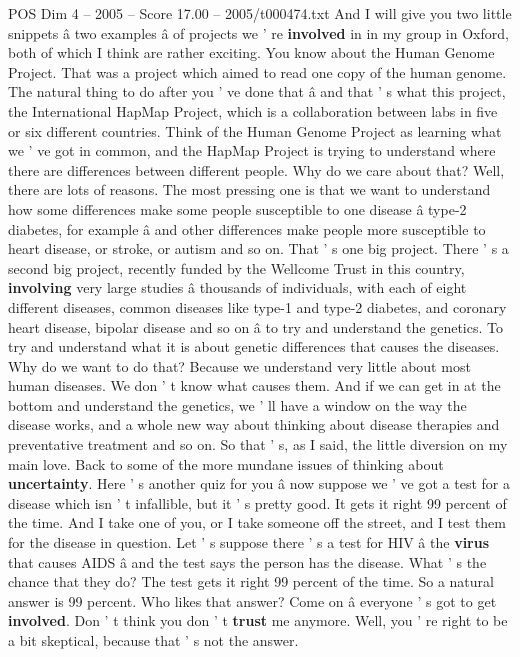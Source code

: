 \begin{textsample}{POS Dim 4 – 2005 – Score 17.00 – 2005/t000474.txt}
And I will give you two little snippets â two examples â of projects we ' re \textbf{involved} in in my group in Oxford, both of which I think are rather exciting.
You know about the Human Genome Project.
That was a project which aimed to read one copy of the human genome.
The natural thing to do after you ' ve done that â and that ' s what this project, the International HapMap Project, which is a collaboration between labs in five or six different countries.
Think of the Human Genome Project as learning what we ' ve got in common, and the HapMap Project is trying to understand where there are differences between different people.
Why do we care about that?
Well, there are lots of reasons.
The most pressing one is that we want to understand how some differences make some people susceptible to one disease â type-2 diabetes, for example â and other differences make people more susceptible to heart disease, or stroke, or autism and so on.
That ' s one big project.
There ' s a second big project, recently funded by the Wellcome Trust in this country, \textbf{involving} very large studies â thousands of individuals, with each of eight different diseases, common diseases like type-1 and type-2 diabetes, and coronary heart disease, bipolar disease and so on â to try and understand the genetics.
To try and understand what it is about genetic differences that causes the diseases.
Why do we want to do that?
Because we understand very little about most human diseases.
We don ' t know what causes them.
And if we can get in at the bottom and understand the genetics, we ' ll have a window on the way the disease works, and a whole new way about thinking about disease therapies and preventative treatment and so on.
So that ' s, as I said, the little diversion on my main love.
Back to some of the more mundane issues of thinking about \textbf{uncertainty}.
Here ' s another quiz for you â now suppose we ' ve got a test for a disease which isn ' t infallible, but it ' s pretty good.
It gets it right 99 percent of the time.
And I take one of you, or I take someone off the street, and I test them for the disease in question.
Let ' s suppose there ' s a test for HIV â the \textbf{virus} that causes AIDS â and the test says the person has the disease.
What ' s the chance that they do?
The test gets it right 99 percent of the time.
So a natural answer is 99 percent.
Who likes that answer?
Come on â everyone ' s got to get \textbf{involved}.
Don ' t think you don ' t \textbf{trust} me anymore.
Well, you ' re right to be a bit skeptical, because that ' s not the answer.

\end{textsample}
